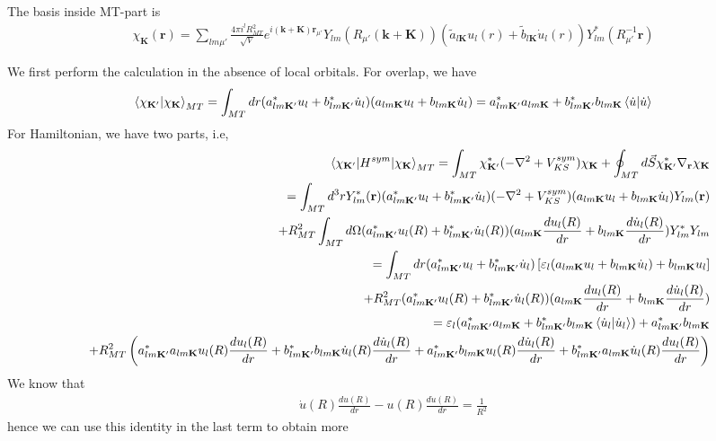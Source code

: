 \documentclass[aps,prb,floatfix,epsfig,singlecolumn,showpacs,preprintnumbers]{revtex4}
\renewcommand{\vr}{{\mathbf{r}}}
\newcommand{\vk}{{\mathbf{k}}}
\newcommand{\vK}{{\mathbf{K}}}
\begin{document}
The basis inside MT-part is
\begin{eqnarray}
\chi_\vK(\vr) = \sum_{lm\mu'} \frac{4\pi i^l R_{MT}^2}{\sqrt{V}}e^{i(\vk+\vK)\vr_{\mu'}}Y_{lm}(R_{\mu'}(\vk+\vK))  
 (\tilde{a}_{l\vK} u_l(r) + \tilde{b}_{l\vK}  \dot{u}_l(r))Y^*_{lm}(R_{\mu'}^{-1}\vr)
\end{eqnarray}

We first perform the calculation in the absence of local orbitals. 
For overlap, we have
\begin{eqnarray}
\braket{\chi_{\vK'}|\chi_\vK}_{MT}=
\int_{MT} dr (a_{lm\vK'}^* u_l+b_{lm\vK'}^* \dot{u}_l) (a_{lm\vK}  u_l+b_{lm\vK} \dot{u}_l)=
a_{lm\vK'}^* a_{lm\vK}  +b_{lm\vK'}^*b_{lm\vK} \braket{\dot{u}|\dot{u}}
\end{eqnarray}
For Hamiltonian, we have two parts, i.e,
\begin{eqnarray}
&&\braket{\chi_{\vK'}|H^{sym}|\chi_\vK}_{MT}=\int_{MT} \chi^*_{\vK'}(-\nabla^2+V_{KS}^{sym})\chi_{\vK}+\oint_{MT} d\vec{S}
\chi^*_{\vK'}\nabla_\vr\chi_{\vK}\\
&&=
\int_{MT}d^3r Y_{lm}^*(\vr) (a_{lm\vK'}^* u_l+b_{lm\vK'}^* \dot{u}_l)
(-\nabla^2+V_{KS}^{sym})  (a_{lm\vK} u_l+b_{lm\vK} \dot{u}_l)Y_{lm}(\vr)
\nonumber\\
&&+R_{MT}^2\int_{MT} d\Omega (a_{lm\vK'}^* u_l(R)+b_{lm\vK'}^*  \dot{u}_l(R))  (a_{lm\vK} \frac{d u_l(R)}{dr}+b_{lm\vK}  \frac{d\dot{u}_l(R)}{dr}) Y_{lm}^*  Y_{lm}
\nonumber\\
&&=
\int_{MT} dr (a_{lm\vK'}^* u_l+b_{lm\vK'}^* \dot{u}_l)  \left[\varepsilon_l(a_{lm\vK} u_l+b_{lm\vK} \dot{u}_l) +b_{lm\vK}  u_l \right]
\nonumber\\
&&+R_{MT}^2 (a_{lm\vK'}^* u_l(R)+b_{lm\vK'}^*  \dot{u}_l(R))  (a_{lm\vK} \frac{d u_l(R)}{dr}+b_{lm\vK}  \frac{d\dot{u}_l(R)}{dr})
\nonumber\\
&&=\varepsilon_l (a_{lm\vK'}^* a_{lm\vK} +b_{lm\vK'}^* b_{lm\vK}  \braket{\dot{u}_l|\dot{u}_l})+a_{lm\vK'}^* b_{lm\vK} 
\\
&&+R_{MT}^2 \left(
a_{lm\vK'}^*a_{lm\vK} u_l(R) \frac{d u_l(R)}{dr}+
b_{lm\vK'}^* b_{lm\vK}  \dot{u}_l(R) \frac{d\dot{u}_l(R)}{dr}+
a_{lm\vK'}^* b_{lm\vK}  u_l(R) \frac{d\dot{u}_l(R)}{dr}+
b_{lm\vK'}^*  a_{lm\vK} \dot{u}_l(R) \frac{d u_l(R)}{dr}\right)\nonumber
\end{eqnarray}
We know that
\begin{eqnarray}
\dot{u}(R)\frac{du(R)}{dr}-u(R) \frac{d\dot{u}(R)}{dr}=\frac{1}{R^2}
\end{eqnarray}
hence we can use this identity in the last term to obtain more
\end{document}
